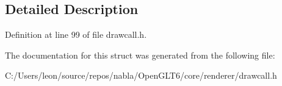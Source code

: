 \subsection{Detailed Description}


Definition at line 99 of file drawcall.\+h.



The documentation for this struct was generated from the following file\+:\begin{DoxyCompactItemize}
\item 
C\+:/\+Users/leon/source/repos/nabla/\+Open\+G\+L\+T6/core/renderer/drawcall.\+h\end{DoxyCompactItemize}
